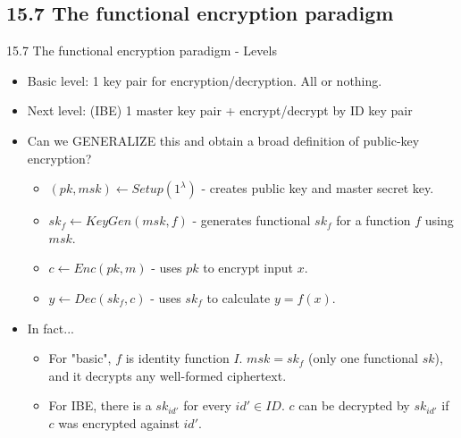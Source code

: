 \documentclass[aspectratio=169,xcolor=dvipsnames]{beamer}
\begin{document}
\subsection{15.7 The functional encryption paradigm}
\begin{frame}{15.7 The functional encryption paradigm - Levels}
\begin{itemize}
    \item Basic level: 1 key pair for encryption/decryption. All or nothing.
    \item Next level: (IBE) 1 master key pair + encrypt/decrypt by ID key pair
    \item Can we GENERALIZE this and obtain a broad definition of public-key encryption?
    \begin{itemize}
        \item $(pk, msk) \leftarrow Setup(1^\lambda)$ - creates public key and master secret key.
        \item $sk_f \leftarrow KeyGen(msk, f)$ - generates functional $sk_f$ for a function $f$ using $msk$.
        \item $c \leftarrow Enc(pk, m)$ - uses $pk$ to encrypt input $x$.
        \item $y \leftarrow Dec(sk_f,c)$ - uses $sk_f$ to calculate $y = f(x)$.
    \end{itemize}
    \item In fact... 
    \begin{itemize}
        \item For "basic", $f$ is identity function $I$. $msk = sk_f$ (only one functional $sk$), and it decrypts any well-formed ciphertext.  
        \item For IBE, there is a $sk_{id'}$ for every $id' \in ID$. $c$ can be decrypted by $sk_{id'}$ if $c$ was encrypted against $id'$.
    \end{itemize}
\end{itemize}
\end{frame}
\end{document}
